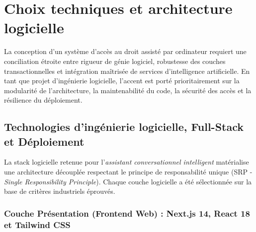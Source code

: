 \section{Choix techniques et architecture logicielle}

La conception d'un système d'accès au droit assisté par ordinateur requiert une conciliation étroite entre rigueur de génie logiciel, robustesse des couches transactionnelles et intégration maîtrisée de services d'intelligence artificielle. En tant que projet d'ingénierie logicielle, l'accent est porté prioritairement sur la modularité de l'architecture, la maintenabilité du code, la sécurité des accès et la résilience du déploiement.

\subsection{Technologies d'ingénierie logicielle, Full-Stack et Déploiement}

La stack logicielle retenue pour l'\textit{assistant conversationnel intelligent} matérialise une architecture découplée respectant le principe de responsabilité unique (SRP - \textit{Single Responsibility Principle}). Chaque couche logicielle a été sélectionnée sur la base de critères industriels éprouvés.

\subsubsection{Couche Présentation (Frontend Web) : Next.js 14, React 18 et Tailwind CSS}

